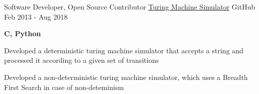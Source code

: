 \begin{cventries}
{\begin{cvitems}
      \end{cvitems}
    }
  \cventry
    {Software Developer, Open Source Contributor}
    {\href{https://github.com/yedhukrishnan/turing-machine}{Turing Machine Simulator}}
    {GitHub}
    {Feb 2013 - Aug 2018}
    {
      \begin{cvitems}
        \item {\textbf{C, Python}}
        \item {Developed a deterministic turing machine simulator that accepts a string and processed it according to a given set of transitions}
        \item {Developed a non-deterministic turing machine simulator, which uses a Breadth First Search in case of non-deteminism}
      \end{cvitems}
    }
\end{cventries}